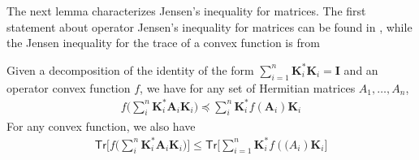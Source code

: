 The next lemma characterizes Jensen's inequality for matrices. The first statement about operator Jensen's inequality for matrices can be found in \cite{TroppIntro15}, while the Jensen inequality for the trace of a convex function is from \cite{HP03}
\begin{lemma}\label{lem:jensen} Given a decomposition of the identity of the form $\sum\limits_{i=1}^{n}\mathbf{K}_i^{*}\mathbf{K}_i = \mathbf{I}$ and an operator convex function $f$, we have for any set of Hermitian matrices $A_1,\ldots,A_n$,
  \begin{align*}
    f\bigg(\sum\limits_{i}^{n}\mathbf{K}_i^{*} \mathbf{A}_i\mathbf{K}_i\bigg) \preceq \sum\limits_{i}^{n}\mathbf{K}_i^{*}f(\mathbf{A}_i)\mathbf{K}_i
  \end{align*}
  For any convex function, we also have
  \begin{align*}
    \mathsf{Tr}\bigg[f\big(\sum\limits_{i}^{n}\mathbf{K}_i^{*}\mathbf{A}_i \mathbf{K}_i\big)\bigg]\leq \mathsf{Tr}\bigg[\sum\limits_{i=1}^{n}\mathbf{K}_i^{*}f(\mathbf({A}_i)\mathbf{K}_i\bigg]
  \end{align*}
\end{lemma}

